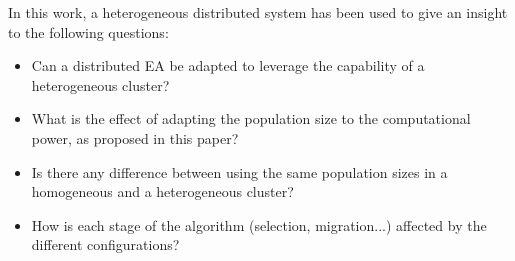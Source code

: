 \documentclass[final,1p,times]{elsarticle}
\begin{document}


In this work, a heterogeneous distributed system has been used to give an insight to the following questions:
\begin{itemize}
 \item Can a distributed EA be adapted to leverage the capability of a
   heterogeneous cluster? %
 \item What is the effect of adapting the population size to the computational power, as proposed in this paper? %
 \item Is there any difference between using the same population sizes in a homogeneous and a heterogeneous cluster?
 \item How is each stage of the algorithm (selection, migration...) affected by the different
   configurations? %
\end{itemize}
\end{document}
